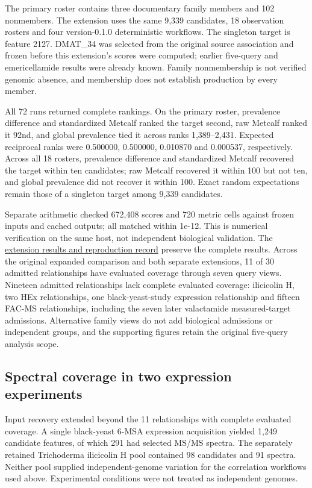 \documentclass[
  10pt,
  a4paper,
]{article}
\begin{document}
The primary roster contains three documentary family members and 102 nonmembers. The extension uses the same 9,339 candidates, 18 observation rosters and four version-0.1.0 deterministic workflows. The singleton target is feature 2127. DMAT\_34 was selected from the original source association and frozen before this extension's scores were computed; earlier five-query and emericellamide results were already known. Family nonmembership is not verified genomic absence, and membership does not establish production by every member.

All 72 runs returned complete rankings. On the primary roster, prevalence difference and standardized Metcalf ranked the target second, raw Metcalf ranked it 92nd, and global prevalence tied it across ranks 1,389--2,431. Expected reciprocal ranks were 0.500000, 0.500000, 0.010870 and 0.000537, respectively. Across all 18 rosters, prevalence difference and standardized Metcalf recovered the target within ten candidates; raw Metcalf recovered it within 100 but not ten, and global prevalence did not recover it within 100. Exact random expectations remain those of a singleton target among 9,339 candidates.

Separate arithmetic checked 672,408 scores and 720 metric cells against frozen inputs and cached outputs; all matched within 1e-12. This is numerical verification on the same host, not independent biological validation. The \href{https://github.com/vinvomero/fungallink-benchmark/blob/main/manuscript/acetylaszonalenin-extension-results-2026-10-08.md}{extension results and reproduction record} preserve the complete results. Across the original expanded comparison and both separate extensions, 11 of 30 admitted relationships have evaluated coverage through seven query views. Nineteen admitted relationships lack complete evaluated coverage: ilicicolin H, two HEx relationships, one black-yeast-study expression relationship and fifteen FAC-MS relationships, including the seven later valactamide measured-target admissions. Alternative family views do not add biological admissions or independent groups, and the supporting figures retain the original five-query analysis scope.

\subsection{Spectral coverage in two expression experiments}\label{spectral-coverage-in-two-expression-experiments}

Input recovery extended beyond the 11 relationships with complete evaluated coverage. A single black-yeast 6-MSA expression acquisition yielded 1,249 candidate features, of which 291 had selected MS/MS spectra. The separately retained Trichoderma ilicicolin H pool contained 98 candidates and 91 spectra. Neither pool supplied independent-genome variation for the correlation workflows used above. Experimental conditions were not treated as independent genomes.
\end{document}
